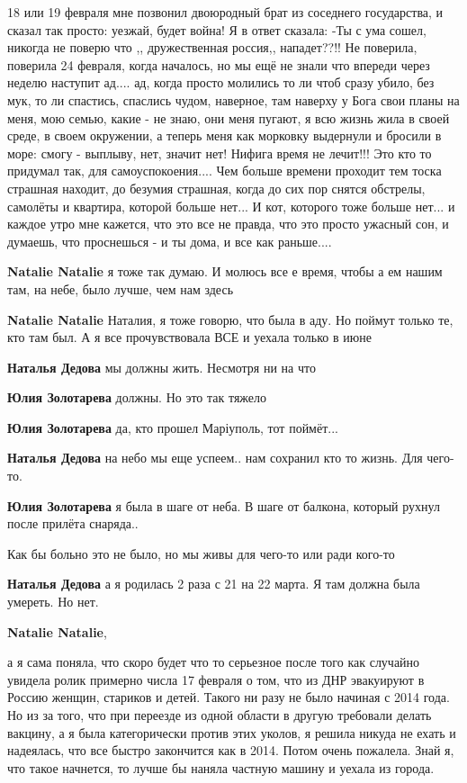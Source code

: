 
18 или 19 февраля мне позвонил двоюродный брат из соседнего государства, и
сказал так просто: уезжай, будет война! Я в ответ сказала: -Ты с ума сошел,
никогда не поверю что ,, дружественная россия,, нападет??!! Не
поверила, поверила 24 февраля, когда началось, но мы ещё не знали что впереди
через неделю наступит ад.... ад, когда просто молились то ли чтоб сразу
убило, без мук, то ли спастись, спаслись чудом, наверное, там наверху у Бога свои
планы на меня, мою семью, какие - не знаю, они меня пугают, я всю жизнь жила в
своей среде, в своем окружении, а теперь меня как морковку выдернули и бросили в
море: смогу - выплыву, нет, значит нет! Нифига время не лечит!!! Это кто то
придумал так, для самоуспокоения.... Чем больше времени проходит тем тоска
страшная находит, до безумия страшная, когда до сих пор снятся обстрелы, самолёты
и квартира, которой больше нет... И кот, которого тоже больше нет... и каждое утро
мне кажется, что это все не правда, что это просто ужасный сон, и думаешь, что
проснешься - и ты дома, и все как раньше....

\begin{itemize} %
\textbf{Natalie Natalie} я тоже так думаю. И молюсь все е время, чтобы а ем нашим там, на небе, было лучше, чем нам здесь🙏🙏🙏

\textbf{Natalie Natalie} Наталия, я тоже говорю, что была в аду. Но поймут только те, кто там был. А я все прочувствовала ВСЕ и уехала только в июне

\textbf{Наталья Дедова} мы должны жить. Несмотря ни на что

\textbf{Юлия Золотарева} должны. Но это так тяжело

\textbf{Юлия Золотарева} да, кто прошел Маріуполь, тот поймёт...

\textbf{Наталья Дедова} на небо мы еще успеем.. нам сохранил кто то жизнь. Для чего-то.

\textbf{Юлия Золотарева} я была в шаге от неба. В шаге от балкона, который рухнул после прилёта снаряда..


Как бы больно это не было, но мы живы для чего-то или ради кого-то

\textbf{Наталья Дедова} а я родилась 2 раза с 21 на 22 марта. Я там должна была умереть. Но нет.

\textbf{Natalie Natalie}, 

а я сама поняла, что скоро будет что то серьезное после того как случайно
увидела ролик примерно числа 17 февраля о том, что из ДНР эвакуируют в Россию
женщин, стариков и детей. Такого ни разу не было начиная с 2014 года. Но из за
того, что при переезде из одной области в другую требовали делать вакцину, а я
была категорически против этих уколов, я решила никуда не ехать и надеялась,
что все быстро закончится как в 2014. Потом очень пожалела. Знай я, что такое
начнется, то лучше бы наняла частную машину и уехала из города.

\end{itemize} %

